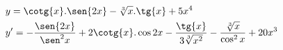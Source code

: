 \begin{ex}
\begin{align}
&y=\cotg{x}.\sen{2x}-\sqrt[3]{x}.\tg{x}+5x^4\nonumber\\
&y'=-\frac{\sen{2x}}{\sen^2{x}}+2\cotg{x}.\cos{2x}-\frac{\tg{x}}{3\sqrt[3]{x^2}}-\frac{\sqrt[3]{x}}{\cos^2{x}}+20x^3\nonumber
\end{align}
\end{ex}